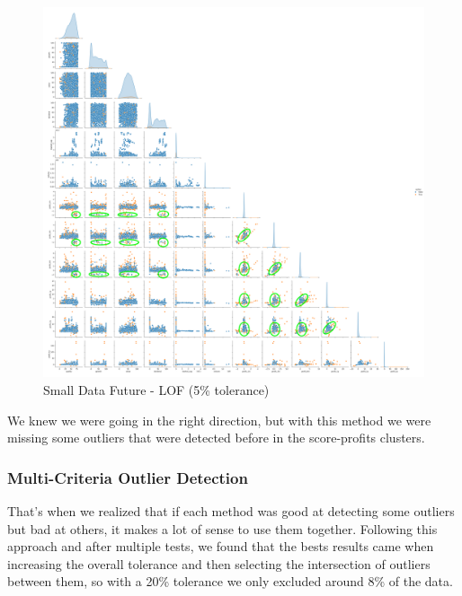 \documentclass[11pt,english,a4paper,hidelinks]{book}
\begin{document}
\begin{figure}[H]
    \centering
    \includegraphics[width=1\textwidth]{images/code/outliers/Small Data future - LOF.png}
    \caption{Small Data Future - LOF (5\% tolerance)}
    \label{fig:small_data_future_lof}
\end{figure}

\noindent We knew we were going in the right direction, but with this method we were missing some outliers that were detected before in the score-profits clusters.

\newpage
\subsubsection{Multi-Criteria Outlier Detection}

That's when we realized that if each method was good at detecting some outliers but bad at others, it makes a lot of sense to use them together. Following this approach and after multiple tests, we found that the bests results came when increasing the overall tolerance and then selecting the intersection of outliers between them, so with a 20\% tolerance we only excluded around 8\% of the data.
\end{document}
